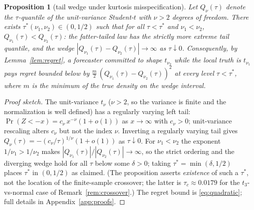 \documentclass[11pt]{article}
\newtheorem{proposition}{Proposition}
\theoremstyle{remark}
\begin{document}
\begin{proposition}[tail wedge under kurtosis misspecification]
\label{prop:wedge}
Let $Q_\nu(\tau)$ denote the $\tau$-quantile of the unit-variance
Student-$t$ with $\nu > 2$ degrees of freedom. There exists
$\tau^*(\nu_1,\nu_2) \in (0, 1/2)$ such that for all
$\tau < \tau^*$ and $\nu_1 < \nu_2$,
$Q_{\nu_1}(\tau) < Q_{\nu_2}(\tau)$: the fatter-tailed law has the
strictly more extreme tail quantile, and the wedge
$|Q_{\nu_1}(\tau) - Q_{\nu_2}(\tau)| \to \infty$ as
$\tau \downarrow 0$. Consequently, by Lemma~\ref{lem:regret}, a
forecaster committed to shape $t_{\nu_2}$ while the local truth is
$t_{\nu_1}$ pays regret bounded below by
$\tfrac{m}{2}\,(Q_{\nu_1}(\tau) - Q_{\nu_2}(\tau))^2$ at every level
$\tau < \tau^*$, where $m$ is the minimum of the true density on the
wedge interval.
\end{proposition}
\begin{proof}[Proof sketch]
The unit-variance $t_\nu$ ($\nu>2$, so the variance is finite and the
normalization is well defined) has a regularly varying left tail:
$\Pr(Z < -x) = c_\nu\, x^{-\nu}(1 + o(1))$ as $x \to \infty$ with
$c_\nu > 0$; unit-variance rescaling alters $c_\nu$ but not the index
$\nu$. Inverting a regularly varying tail \citep{embrechts1997} gives
$Q_\nu(\tau) = -(c_\nu/\tau)^{1/\nu}(1+o(1))$ as $\tau \downarrow 0$.
For $\nu_1 < \nu_2$ the exponent $1/\nu_1 > 1/\nu_2$ makes
$|Q_{\nu_1}(\tau)| / |Q_{\nu_2}(\tau)| \to \infty$, so the strict
ordering and the diverging wedge hold for all $\tau$ below some
$\delta > 0$; taking $\tau^* = \min(\delta, 1/2)$ places $\tau^*$ in
$(0,1/2)$ as claimed. (The proposition asserts \emph{existence} of such
a $\tau^*$, not the location of the finite-sample crossover; the latter
is $\tau_c\approx 0.0179$ for the $t_3$-vs-normal case of
Remark~\ref{rem:crossover}.) The regret bound is \eqref{eq:quadratic};
full details in Appendix~\ref{app:proofs}.
\end{proof}
\end{document}
